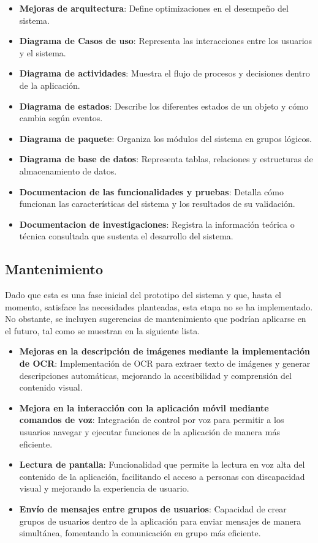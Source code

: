 \documentclass[lettersize,journal]{IEEEtran}
\begin{document}
\begin{itemize}
	\item \textbf{Mejoras de arquitectura}: Define optimizaciones en el desempeño del sistema.
	\item \textbf{Diagrama de Casos de uso}: Representa las interacciones entre los usuarios y el sistema.
	\item \textbf{Diagrama de actividades}: Muestra el flujo de procesos y decisiones dentro de la aplicación.
	\item \textbf{Diagrama de estados}: Describe los diferentes estados de un objeto y cómo cambia según eventos.
	\item \textbf{Diagrama de paquete}: Organiza los módulos del sistema en grupos lógicos.
	\item \textbf{Diagrama de base de datos}: Representa tablas, relaciones y estructuras de almacenamiento de datos.
	\item \textbf{Documentacion de las funcionalidades y pruebas}: Detalla cómo funcionan las características del sistema y los resultados de su validación.
	\item \textbf{Documentacion de investigaciones}: Registra la información teórica o técnica consultada que sustenta el desarrollo del sistema.
\end{itemize}

\subsection {Mantenimiento}

Dado que esta es una fase inicial del prototipo del sistema y que, hasta el momento, satisface las necesidades planteadas, esta etapa no se ha implementado. No obstante, se incluyen sugerencias de mantenimiento que podrían aplicarse en el futuro, tal como se muestran en la siguiente lista.

\begin{itemize}
	\item \textbf{Mejoras en la descripción de imágenes mediante la implementación de OCR}: Implementación de OCR para extraer texto de imágenes y generar descripciones automáticas, mejorando la accesibilidad y comprensión del contenido visual.
	
	\item \textbf{Mejora en la interacción con la aplicación móvil mediante comandos de voz}: Integración de control por voz para permitir a los usuarios navegar y ejecutar funciones de la aplicación de manera más eficiente.
	
	\item \textbf{Lectura de pantalla}: Funcionalidad que permite la lectura en voz alta del contenido de la aplicación, facilitando el acceso a personas con discapacidad visual y mejorando la experiencia de usuario.
	
	\item \textbf{Envío de mensajes entre grupos de usuarios}: Capacidad de crear grupos de usuarios dentro de la aplicación para enviar mensajes de manera simultánea, fomentando la comunicación en grupo más eficiente.
\end{itemize}
\end{document}
